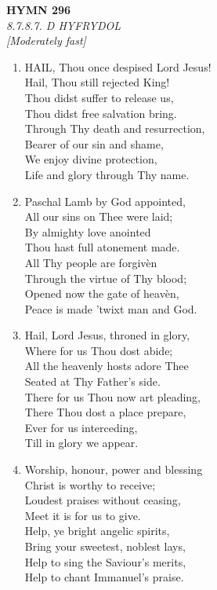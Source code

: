 \documentclass[11pt,a4paper]{article}
\begin{document}
\newpage
\begin{center}
    {\Large \textbf{HYMN 296}}
    \\
    \textit{8.7.8.7. D HYFRYDOL}
    \\
    \textit{\small [Moderately fast]}
\end{center}
\vspace{1em}

\begin{enumerate}
    \item HAIL, Thou once despised Lord Jesus! \\
        Hail, Thou still rejected King! \\
        Thou didst suffer to release us, \\
        Thou didst free salvation bring. \\
        Through Thy death and resurrection, \\
        Bearer of our sin and shame, \\
        We enjoy divine protection, \\
        Life and glory through Thy name.

    \item Paschal Lamb by God appointed, \\
        All our sins on Thee were laid; \\
        By almighty love anointed \\
        Thou hast full atonement made. \\
        All Thy people are forgiv\`en \\
        Through the virtue of Thy blood; \\
        Opened now the gate of heav\`en, \\
        Peace is made 'twixt man and God.

    \item Hail, Lord Jesus, throned in glory, \\
        Where for us Thou dost abide; \\
        All the heavenly hosts adore Thee \\
        Seated at Thy Father's side. \\
        There for us Thou now art pleading, \\
        There Thou dost a place prepare, \\
        Ever for us interceding, \\
        Till in glory we appear.

    \item Worship, honour, power and blessing \\
        Christ is worthy to receive; \\
        Loudest praises without ceasing, \\
        Meet it is for us to give. \\
        Help, ye bright angelic spirits, \\
        Bring your sweetest, noblest lays, \\
        Help to sing the Saviour's merits, \\
        Help to chant Immanuel's praise.

\end{enumerate}
\end{document}
